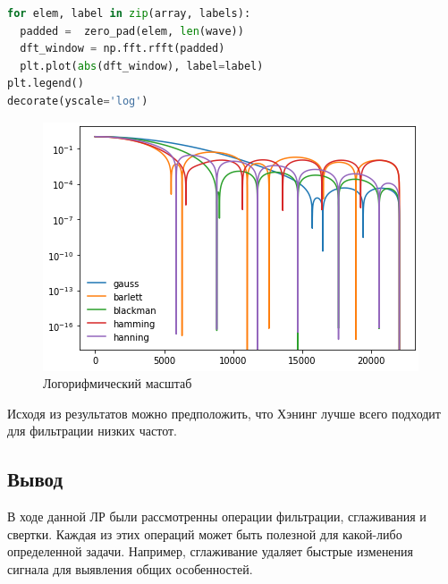 \begin{lstlisting}[language=Python]
for elem, label in zip(array, labels):
  padded =  zero_pad(elem, len(wave))
  dft_window = np.fft.rfft(padded)
  plt.plot(abs(dft_window), label=label)
plt.legend()
decorate(yscale='log')
\end{lstlisting}
\begin{figure}[H]
	\begin{center}
		\includegraphics[scale=1]{fig/lab08/lab8_10.png}
		\caption{Логорифмический масштаб}
	\end{center}
\end{figure}

Исходя из результатов можно предположить, что Хэнинг лучше всего подходит для фильтрации низких частот.

\subsection{Вывод}

В ходе данной ЛР были рассмотренны операции фильтрации, сглаживания и свертки. Каждая из этих операций может быть полезной для какой-либо определенной задачи. Например, сглаживание удаляет быстрые изменения сигнала для выявления общих особенностей.
